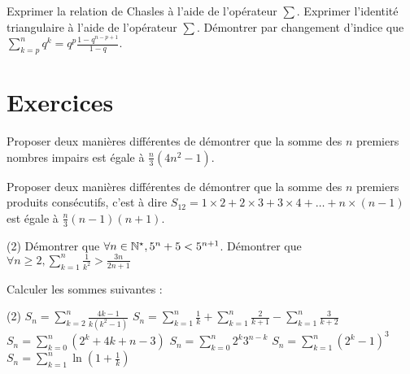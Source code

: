\begin{exercise}[subtitle=Relation  de  Chasles et identité triangulaire, extype=cours]
	\begin{tasks} 
		\task Exprimer  la relation de Chasles à l'aide de l'opérateur $\sum$.
		\task Exprimer  l'identité triangulaire à l'aide de l'opérateur $\sum$.
		\task Démontrer par changement d'indice que $ \sum\limits_{k=p}^n q^k = q^p\frac{1 - q^{n-p+1}}{1-q}$.
	\end{tasks}
\end{exercise}


\section{Exercices}

\begin{exercise}[subtitle=Sommes des impairs, difficulty=*]
	Proposer deux manières différentes de démontrer que la somme des $n$ premiers nombres impairs est égale à $\frac{n}{3}(4n^2-1)$.
\end{exercise}

\begin{exercise}[subtitle=Sommes des produits des consécutifs, difficulty=*]
	Proposer deux manières différentes de démontrer que la somme des $n$ premiers produits consécutifs, c'est à dire $S_{12} = 1\times2 + 2\times3 +3\times4 + \dots + n\times(n-1)$ est égale à $\frac{n}{3}(n-1)(n+1)$.
\end{exercise}

\begin{exercise}[subtitle=Inégalité et récurrence, difficulty=*]
		\begin{tasks}(2)
		\task Démontrer que $\forall n \in \mathbb{N}^\star, 5^n + 5 < 5^{n+1}$.
		\task Démontrer que  $\forall n \ge 2, \sum\limits_{k=1}^n \frac{1}{k^2} > \frac{3n}{2n+1}$
		\end{tasks}
\end{exercise}

\begin{exercise}[subtitle=Calcul de sommes, difficulty=*]
Calculer les sommes suivantes :
	\begin{tasks}(2)
		\task $S_n = \sum\limits_{k=2}^n \frac{4k-1}{k(k^2-1)}$
		\task $S_n = \sum\limits_{k=1}^n \frac{1}{k} + \sum\limits_{k=1}^n\frac{2}{k+1} - \sum\limits_{k=1}^n\frac{3}{k+2}$	
		\task $S_n = \sum\limits_{k=0}^n (2^k + 4k +n -3)$
	    \task $S_n = \sum\limits_{k=0}^n 2^k3^{n-k}$
	    \task $S_n = \sum\limits_{k=1}^n (2^k-1)^3$
	     \task $S_n = \sum\limits_{k=1}^n \ln (1 + \frac{1}{k})$
	\end{tasks}
\end{exercise}

